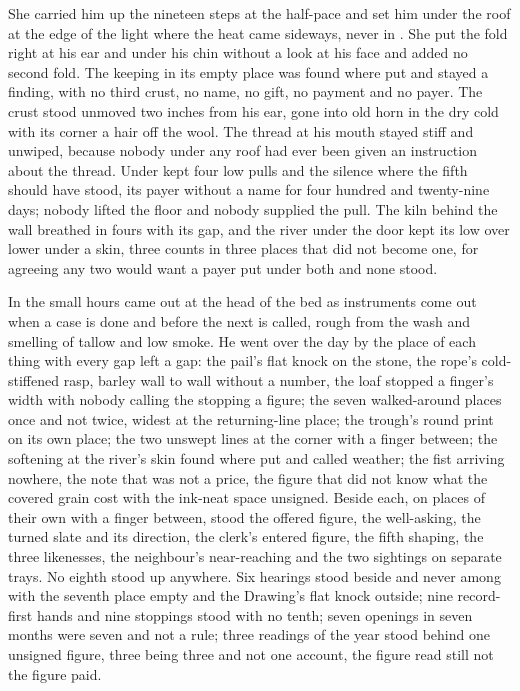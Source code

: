 She carried him up the nineteen steps at the half-pace and set him under the roof at the edge of the light where the heat came sideways, never in . She put the fold right at his ear and under his chin without a look at his face and added no second fold. The keeping in its empty place was found where put and stayed a finding, with no third crust, no name, no gift, no payment and no payer. The crust stood unmoved two inches from his ear, gone into old horn in the dry cold with its corner a hair off the wool. The thread at his mouth stayed stiff and unwiped, because nobody under any roof had ever been given an instruction about the thread. Under   kept four low pulls and the silence where the fifth should have stood, its payer without a name for four hundred and twenty-nine days; nobody lifted the floor and nobody supplied the pull. The kiln behind the wall breathed in fours with its gap, and the river under the door kept its low over lower under a skin, three counts in three places that did not become one, for agreeing any two would want a payer put under both and none stood.

\scenebreak

In the small hours  came out at the head of the bed as instruments come out when a case is done and before the next is called, rough from the wash and smelling of tallow and low smoke. He went over the day by the place of each thing with every gap left a gap: the pail's flat knock on the stone, the rope's cold-stiffened rasp, barley wall to wall without a number, the loaf stopped a finger's width with nobody calling the stopping a figure; the seven walked-around places once and not twice, widest at the returning-line place; the trough's round print on its own place; the two unswept lines at the corner with a finger between; the softening at the river's skin found where put and called weather; the fist arriving nowhere, the note that was not a price, the figure that did not know what the covered grain cost with the ink-neat space unsigned. Beside each, on places of their own with a finger between, stood the offered figure, the well-asking, the turned slate and its direction, the clerk's entered figure, the fifth shaping, the three likenesses, the neighbour's near-reaching and the two sightings on separate trays. No eighth stood up anywhere. Six hearings stood beside and never among with the seventh place empty and the Drawing's flat knock outside; nine record-first hands and nine stoppings stood with no tenth; seven openings in seven months were seven and not a rule; three readings of the year stood behind one unsigned figure, three being three and not one account, the figure read still not the figure paid.

